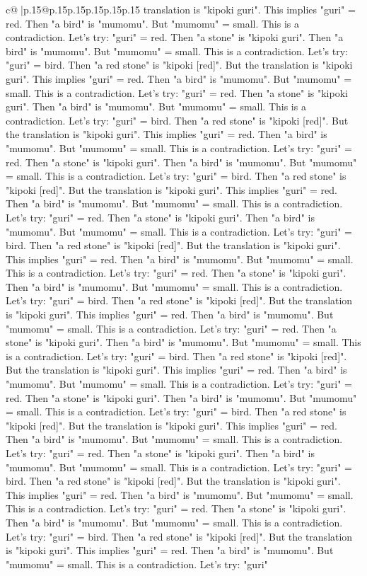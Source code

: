 \documentclass{article}
\begin{document}
{\begin{supertabular}{c@{$\;$}|p{.15\linewidth}@{}p{.15\linewidth}p{.15\linewidth}p{.15\linewidth}p{.15\linewidth}p{.15\linewidth}}
{{{translation is "kipoki guri". This implies "guri" = red. Then "a bird" is "mumomu". But "mumomu" = small. This is a contradiction. Let's try: "guri" = red. Then "a stone" is "kipoki guri". Then "a bird" is "mumomu". But "mumomu" = small. This is a contradiction. Let's try: "guri" = bird. Then "a red stone" is "kipoki {[}red{]}". But the translation is "kipoki guri". This implies "guri" = red. Then "a bird" is "mumomu". But "mumomu" = small. This is a contradiction. Let's try: "guri" = red. Then "a stone" is "kipoki guri". Then "a bird" is "mumomu". But "mumomu" = small. This is a contradiction. Let's try: "guri" = bird. Then "a red stone" is "kipoki {[}red{]}". But the translation is "kipoki guri". This implies "guri" = red. Then "a bird" is "mumomu". But "mumomu" = small. This is a contradiction. Let's try: "guri" = red. Then "a stone" is "kipoki guri". Then "a bird" is "mumomu". But "mumomu" = small. This is a contradiction. Let's try: "guri" = bird. Then "a red stone" is "kipoki {[}red{]}". But the translation is "kipoki guri". This implies "guri" = red. Then "a bird" is "mumomu". But "mumomu" = small. This is a contradiction. Let's try: "guri" = red. Then "a stone" is "kipoki guri". Then "a bird" is "mumomu". But "mumomu" = small. This is a contradiction. Let's try: "guri" = bird. Then "a red stone" is "kipoki {[}red{]}". But the translation is "kipoki guri". This implies "guri" = red. Then "a bird" is "mumomu". But "mumomu" = small. This is a contradiction. Let's try: "guri" = red. Then "a stone" is "kipoki guri". Then "a bird" is "mumomu". But "mumomu" = small. This is a contradiction. Let's try: "guri" = bird. Then "a red stone" is "kipoki {[}red{]}". But the translation is "kipoki guri". This implies "guri" = red. Then "a bird" is "mumomu". But "mumomu" = small. This is a contradiction. Let's try: "guri" = red. Then "a stone" is "kipoki guri". Then "a bird" is "mumomu". But "mumomu" = small. This is a contradiction. Let's try: "guri" = bird. Then "a red stone" is "kipoki {[}red{]}". But the translation is "kipoki guri". This implies "guri" = red. Then "a bird" is "mumomu". But "mumomu" = small. This is a contradiction. Let's try: "guri" = red. Then "a stone" is "kipoki guri". Then "a bird" is "mumomu". But "mumomu" = small. This is a contradiction. Let's try: "guri" = bird. Then "a red stone" is "kipoki {[}red{]}". But the translation is "kipoki guri". This implies "guri" = red. Then "a bird" is "mumomu". But "mumomu" = small. This is a contradiction. Let's try: "guri" = red. Then "a stone" is "kipoki guri". Then "a bird" is "mumomu". But "mumomu" = small. This is a contradiction. Let's try: "guri" = bird. Then "a red stone" is "kipoki {[}red{]}". But the translation is "kipoki guri". This implies "guri" = red. Then "a bird" is "mumomu". But "mumomu" = small. This is a contradiction. Let's try: "guri" = red. Then "a stone" is "kipoki guri". Then "a bird" is "mumomu". But "mumomu" = small. This is a contradiction. Let's try: "guri" = bird. Then "a red stone" is "kipoki {[}red{]}". But the translation is "kipoki guri". This implies "guri" = red. Then "a bird" is "mumomu". But "mumomu" = small. This is a contradiction. Let's try: "guri" }}}
\end{supertabular}}
\end{document}

